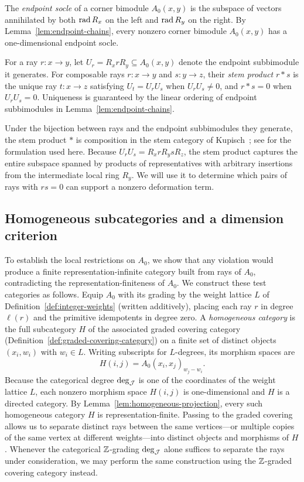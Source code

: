 The \emph{endpoint socle} of a corner bimodule $A_0(x,y)$ is the subspace of vectors annihilated by both $\operatorname{rad} R_x$ on the left and $\operatorname{rad} R_y$ on the right. By Lemma~\ref{lem:endpoint-chains}, every nonzero corner bimodule $A_0(x,y)$ has a one-dimensional endpoint socle.

\begin{definition}
\label{def:stem-product}
For a ray $r\colon x\to y$, let $U_r=R_xrR_y\subseteq A_0(x,y)$ denote the endpoint subbimodule it generates. For composable rays $r\colon x\to y$ and $s\colon y\to z$, their \emph{stem product} $r*s$ is the unique ray $t\colon x\to z$ satisfying $U_t=U_rU_s$ when $U_rU_s\ne0$, and $r*s=0$ when $U_rU_s=0$. Uniqueness is guaranteed by the linear ordering of endpoint subbimodules in Lemma~\ref{lem:endpoint-chains}.
\end{definition}

Under the bijection between rays and the endpoint subbimodules they generate, the stem product $*$ is composition in the stem category of Kupisch~\cite{Kupisch}; see \cite[Section~2.3]{BongartzSurvey} for the formulation used here. Because $U_rU_s=R_xrR_ysR_z$, the stem product captures the entire subspace spanned by products of representatives with arbitrary insertions from the intermediate local ring $R_y$. We will use it to determine which pairs of rays with $rs=0$ can support a nonzero deformation term.

\subsection{Homogeneous subcategories and a dimension criterion}
\label{subsec:homogeneous-local-categories}

To establish the local restrictions on $A_0$, we show that any violation would produce a finite representation-infinite category built from rays of $A_0$, contradicting the representation-finiteness of $A_0$. We construct these test categories as follows. Equip $A_0$ with its grading by the weight lattice $L$ of Definition~\ref{def:integer-weights} (written additively), placing each ray $r$ in degree $\ell(r)$ and the primitive idempotents in degree zero. A \emph{homogeneous category} is the full subcategory $H$ of the associated graded covering category (Definition~\ref{def:graded-covering-category}) on a finite set of distinct objects $(x_i,w_i)$ with $w_i\in L$. Writing subscripts for $L$-degrees, its morphism spaces are
\[
  H(i,j)=A_0(x_i,x_j)_{w_j-w_i}.
\]
Because the categorical degree $\deg_\mathcal J$ is one of the coordinates of the weight lattice $L$, each nonzero morphism space $H(i,j)$ is one-dimensional and $H$ is a directed category. By Lemma~\ref{lem:homogeneous-projection}, every such homogeneous category $H$ is representation-finite. Passing to the graded covering allows us to separate distinct rays between the same vertices—or multiple copies of the same vertex at different weights—into distinct objects and morphisms of $H$. Whenever the categorical $\mathbb Z$-grading $\deg_\mathcal J$ alone suffices to separate the rays under consideration, we may perform the same construction using the $\mathbb Z$-graded covering category instead.

